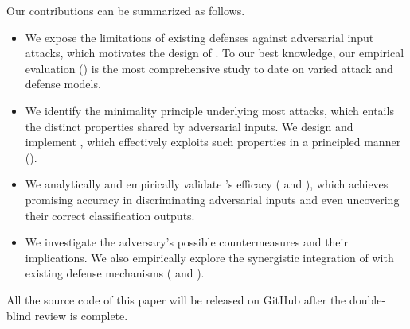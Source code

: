 Our contributions can be summarized as follows.
\begin{itemize}
    \item We expose the limitations of existing defenses against adversarial input attacks, which motivates the design of \system. To our best knowledge, our empirical evaluation () is the most comprehensive study to date on varied attack and defense models.

    \item We identify the minimality principle underlying most attacks, which entails the distinct properties shared by adversarial inputs. We design and implement \system, which effectively exploits such properties in a principled manner ().

    \item We analytically and empirically validate \system's efficacy (  and ), which achieves promising accuracy in discriminating adversarial inputs and even uncovering their correct classification outputs.

    \item We investigate the adversary's possible countermeasures and their implications. We also empirically explore the synergistic integration of \system with existing defense mechanisms ( and ).

\end{itemize}



All the source code of this paper will be released on {\sf GitHub} after the double-blind review is complete.
